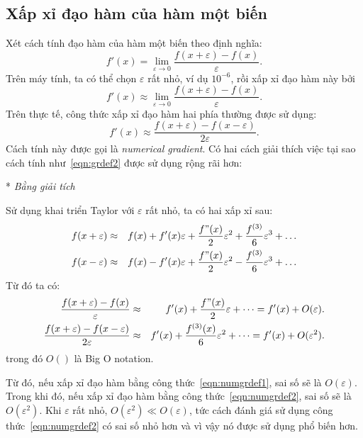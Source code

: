\subsection{Xấp xỉ đạo hàm của hàm một biến}
\label{sub:xap_xi_dao_ham_cua_ham_mot_bien}
Xét cách tính đạo hàm của hàm một biến theo định nghĩa:
\begin{equation}
    \label{eqn:grdef1}
    f'(x) = \lim_{\varepsilon \rightarrow 0}\frac{f(x + \varepsilon) -
    f(x)}{\varepsilon}.
\end{equation}
Trên máy tính, ta có thể chọn $\varepsilon$ rất nhỏ, ví dụ $10^{-6}$, rồi xấp xỉ đạo hàm này bởi
\begin{equation}
    f'(x) \approx \lim_{\varepsilon \rightarrow 0}\frac{f(x + \varepsilon) -
    f(x)}{\varepsilon}.
\end{equation}
Trên thực tế, công thức xấp xỉ đạo hàm hai phía thường được sử dụng:
\begin{equation}
    \label{eqn:grdef2}
    f'(x) \approx \frac{f(x + \varepsilon) - f(x - \varepsilon)}{2\varepsilon}.
\end{equation}
Cách tính này được gọi là \textit{numerical gradient}. Có hai cách giải thích việc tại sao cách tính như~\eqref{eqn:grdef2} được sử dụng rộng rãi hơn:

* \textit{Bằng giải tích}

Sử dụng khai triển Taylor với $\varepsilon$ rất nhỏ, ta có hai xấp xỉ sau:
\begin{eqnarray}
    f(x + \varepsilon) &\approx& f(x) + f'(x)\varepsilon + \frac{f"(x)}{2}
    \varepsilon^2 + \frac{f^{(3)}}{6}\varepsilon^3 + \dots \\
f(x - \varepsilon) &\approx& f(x) - f'(x)\varepsilon + \frac{f"(x)}{2}
\varepsilon^2 - \frac{f^{(3)}}{6}\varepsilon^3 + \dots
\end{eqnarray}
%
Từ đó ta có:
\begin{eqnarray}
\label{eqn:numgrdef1}
\frac{f(x + \varepsilon) - f(x)}{\varepsilon} &\approx& f'(x) +
\frac{f"(x)}{2}\varepsilon + \dots =  f'(x) + O(\varepsilon). \\
\label{eqn:numgrdef2}
\frac{f(x + \varepsilon) - f(x - \varepsilon)}{2\varepsilon} &\approx& f'(x) +
\frac{f^{(3)}(x)}{6}\varepsilon^2 + \dots =  f'(x) + O(\varepsilon^2).
\end{eqnarray}
trong đó $O()$ là {Big O notation}.

Từ đó, nếu xấp xỉ đạo hàm bằng công thức~\eqref{eqn:numgrdef1}, sai số sẽ là $O(\varepsilon)$. Trong khi đó, nếu xấp xỉ đạo hàm bằng công
thức~\eqref{eqn:numgrdef2}, sai số sẽ là
$O(\varepsilon^2)$. Khi $\varepsilon$ rất nhỏ, $O(\varepsilon^2) \ll
O(\varepsilon)$, tức cách đánh giá sử dụng công thức~\eqref{eqn:numgrdef2} có sai
số nhỏ hơn và vì vậy nó được sử dụng phổ biến hơn.

